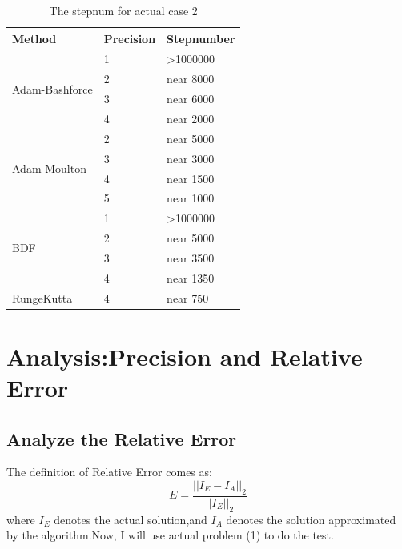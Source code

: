 \documentclass[UTF8]{ctexart}
\theoremstyle{plain}
\theoremstyle{definition}
\theoremstyle{remark}
\begin{document}
\begin{table}[H]
\centering
\begin{tabular}{|l|l|l|}
\hline
Method                          & Precision & Stepnumber            \\ \hline
\multirow{4}{*}{Adam-Bashforce} & 1         & \textgreater{}1000000 \\ \cline{2-3} 
                                & 2         & near 8000             \\ \cline{2-3} 
                                & 3         & near 6000             \\ \cline{2-3} 
                                & 4         & near 2000             \\ \hline
\multirow{4}{*}{Adam-Moulton}   & 2         & near 5000             \\ \cline{2-3} 
                                & 3         & near 3000             \\ \cline{2-3} 
                                & 4         & near 1500             \\ \cline{2-3} 
                                & 5         & near 1000             \\ \hline
\multirow{4}{*}{BDF}            & 1         & \textgreater{}1000000 \\ \cline{2-3} 
                                & 2         & near 5000             \\ \cline{2-3} 
                                & 3         & near 3500             \\ \cline{2-3} 
                                & 4         & near 1350             \\ \hline
RungeKutta                      & 4         & near 750              \\ \hline
\end{tabular}
\caption{The stepnum for actual case 2}
\end{table}
\section{Analysis:Precision and Relative Error}
\subsection{Analyze the Relative Error}
The definition of Relative Error comes as:
$$
E=\frac{||I_{E}-I_{A}||_{2}}{||I_{E}||_{2}}
$$
where $I_{E}$ denotes the actual solution,and $I_{A}$ denotes the solution approximated by the algorithm.Now, I will use actual problem (1) to do the test. 
\end{document}
